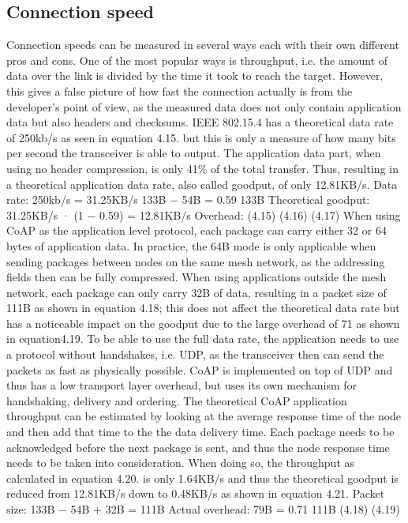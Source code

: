 \subsection{Connection speed}
Connection speeds can be measured in several ways each with their own different pros and cons.
One of the most popular ways is throughput,
	i.e.
the amount of data over the link is divided by the time it took to reach the target.
However,
	this gives a false picture of how fast the connection actually is from the developer’s point of view,
	as the measured data does not only contain application data but also headers and checksums.
IEEE 802.15.4 has a theoretical data rate of 250kb/s as seen in equation 4.15.
but this is only a measure of how many bits per second the transceiver is able to output.
The application data part,
	when using no header compression,
	is only 41\% of the total transfer.
Thus,
	resulting in a theoretical application
data rate,
	also called goodput,
	of only 12.81KB/s.
Data rate: 250kb/s = 31.25KB/s 133B − 54B = 0.59 133B Theoretical goodput: 31.25KB/s · (1 − 0.59) = 12.81KB/s Overhead:
	(4.15) (4.16) (4.17) When using CoAP as the application level protocol,
	each package can carry either 32 or 64 bytes of application data.
In practice,
	the 64B mode is only applicable when sending packages between nodes on the same mesh network,
	as the addressing fields then can be fully compressed.
When using applications outside the mesh network,
	each package can only carry 32B of data,
	resulting in a packet size of 111B as shown in equation 4.18;
	this does not affect the theoretical data rate but has a noticeable impact on the goodput due to the large overhead of 71%
	as shown in equation4.19.
To be able to use the full data rate,
	the application needs to use a protocol without handshakes,
	i.e.
UDP,
	as the transceiver then can send the packets as fast as physically possible.
CoAP is implemented on top of UDP and thus has a low transport layer overhead,
	but uses its own mechanism for handshaking,
	delivery and ordering.
The theoretical CoAP application throughput can be estimated by looking at the average response time of the node and then add that time to the the data delivery time.
Each package needs to be acknowledged before the next package is sent,
	and thus the node response time needs to be taken into consideration.
When doing so,
	the throughput as calculated in equation 4.20.
is only 1.64KB/s and thus the theoretical goodput is reduced from 12.81KB/s down to 0.48KB/s as shown in equation 4.21.
Packet size: 133B − 54B + 32B = 111B Actual overhead: 79B = 0.71 111B (4.18) (4.19) 

